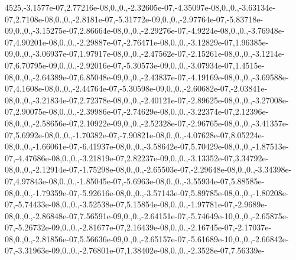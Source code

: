 {4525,-\/3.\-1577e-\/07,2.\-77216e-\/08,0.,0.,-\/2.\-32605e-\/07,-\/4.\-35097e-\/08,0.,0.,-\/3.\-63134e-\/07,2.\-7108e-\/08,0.,0.,-\/2.\-8181e-\/07,-\/5.\-31772e-\/09,0.,0.,-\/2.\-97764e-\/07,-\/5.\-83718e-\/09,0.,0.,-\/3.\-15275e-\/07,2.\-86664e-\/08,0.,0.,-\/2.\-29276e-\/07,-\/4.\-9224e-\/08,0.,0.,-\/3.\-76948e-\/07,4.\-90201e-\/08,0.,0.,-\/2.\-29887e-\/07,-\/2.\-76471e-\/08,0.,0.,-\/3.\-12829e-\/07,1.\-96385e-\/09,0.,0.,-\/3.\-06937e-\/07,1.\-97917e-\/08,0.,0.,-\/2.\-47562e-\/07,-\/2.\-15261e-\/08,0.,0.,-\/3.\-1214e-\/07,6.\-70795e-\/09,0.,0.,-\/2.\-92016e-\/07,-\/5.\-30573e-\/09,0.,0.,-\/3.\-07934e-\/07,1.\-4515e-\/08,0.,0.,-\/2.\-64389e-\/07,6.\-85048e-\/09,0.,0.,-\/2.\-43837e-\/07,-\/4.\-19169e-\/08,0.,0.,-\/3.\-69588e-\/07,4.\-1608e-\/08,0.,0.,-\/2.\-44764e-\/07,-\/5.\-30598e-\/09,0.,0.,-\/2.\-60682e-\/07,-\/2.\-03841e-\/08,0.,0.,-\/3.\-21834e-\/07,2.\-72378e-\/08,0.,0.,-\/2.\-40121e-\/07,-\/2.\-89625e-\/08,0.,0.,-\/3.\-27008e-\/07,2.\-90075e-\/08,0.,0.,-\/2.\-39986e-\/07,-\/2.\-74629e-\/08,0.,0.,-\/3.\-22374e-\/07,2.\-12396e-\/08,0.,0.,-\/2.\-58656e-\/07,2.\-10922e-\/09,0.,0.,-\/2.\-52328e-\/07,-\/2.\-96765e-\/08,0.,0.,-\/3.\-41357e-\/07,5.\-6992e-\/08,0.,0.,-\/1.\-70382e-\/07,-\/7.\-90821e-\/08,0.,0.,-\/4.\-07628e-\/07,8.\-05224e-\/08,0.,0.,-\/1.\-66061e-\/07,-\/6.\-41937e-\/08,0.,0.,-\/3.\-58642e-\/07,5.\-70429e-\/08,0.,0.,-\/1.\-87513e-\/07,-\/4.\-47686e-\/08,0.,0.,-\/3.\-21819e-\/07,2.\-82237e-\/09,0.,0.,-\/3.\-13352e-\/07,3.\-34792e-\/08,0.,0.,-\/2.\-12914e-\/07,-\/1.\-75298e-\/08,0.,0.,-\/2.\-65503e-\/07,-\/2.\-29648e-\/08,0.,0.,-\/3.\-34398e-\/07,4.\-97843e-\/08,0.,0.,-\/1.\-85045e-\/07,-\/5.\-6963e-\/08,0.,0.,-\/3.\-55934e-\/07,5.\-88585e-\/08,0.,0.,-\/1.\-79359e-\/07,-\/5.\-92616e-\/08,0.,0.,-\/3.\-57143e-\/07,5.\-89785e-\/08,0.,0.,-\/1.\-80208e-\/07,-\/5.\-74433e-\/08,0.,0.,-\/3.\-52538e-\/07,5.\-15854e-\/08,0.,0.,-\/1.\-97781e-\/07,-\/2.\-9689e-\/08,0.,0.,-\/2.\-86848e-\/07,7.\-56591e-\/09,0.,0.,-\/2.\-64151e-\/07,-\/5.\-74649e-\/10,0.,0.,-\/2.\-65875e-\/07,-\/5.\-26732e-\/09,0.,0.,-\/2.\-81677e-\/07,2.\-16439e-\/08,0.,0.,-\/2.\-16745e-\/07,-\/2.\-17037e-\/08,0.,0.,-\/2.\-81856e-\/07,5.\-56636e-\/09,0.,0.,-\/2.\-65157e-\/07,-\/5.\-61689e-\/10,0.,0.,-\/2.\-66842e-\/07,-\/3.\-31963e-\/09,0.,0.,-\/2.\-76801e-\/07,1.\-38402e-\/08,0.,0.,-\/2.\-3528e-\/07,7.\-56339e-}
